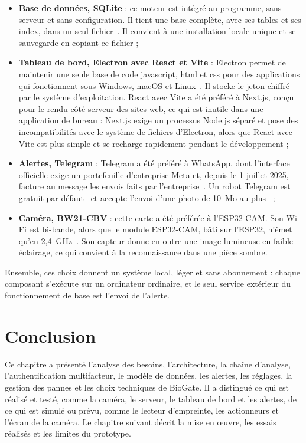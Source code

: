\begin{maj}
\begin{itemize}
  \item \textbf{Base de données, SQLite} : ce moteur est intégré au programme, sans serveur et sans configuration. Il tient une base complète, avec ses tables et ses index, dans un seul fichier~\cite{sqlite_about}. Il convient à une installation locale unique et se sauvegarde en copiant ce fichier ;
  \item \textbf{Tableau de bord, Electron avec React et Vite} : Electron permet de maintenir une seule base de code \gls{javascript}, \gls{html} et \gls{css} pour des applications qui fonctionnent sous Windows, macOS et Linux~\cite{electron_docs}. Il stocke le jeton chiffré par le système d'exploitation. React avec Vite a été préféré à Next.js, conçu pour le rendu côté serveur des sites web, ce qui est inutile dans une application de bureau : Next.js exige un processus Node.js séparé et pose des incompatibilités avec le système de fichiers d'Electron, alors que React avec Vite est plus simple et se recharge rapidement pendant le développement ;
  \item \textbf{Alertes, Telegram} : Telegram a été préféré à WhatsApp, dont l'interface officielle exige un portefeuille d'entreprise Meta et, depuis le 1\ier{} juillet 2025, facture au message les envois faits par l'entreprise~\cite{meta_wa_overview,meta_wa_pricing}. Un robot Telegram est gratuit par défaut~\cite{telegram_botfaq} et accepte l'envoi d'une photo de 10~Mo au plus~\cite{telegram_botapi} ;
  \item \textbf{Caméra, BW21-CBV} : cette carte a été préférée à l'ESP32-CAM. Son Wi-Fi est bi-bande, alors que le module ESP32-CAM, bâti sur l'ESP32, n'émet qu'en 2,4~GHz~\cite{aithinker_bw21_spec,aithinker_esp32cam,espressif_esp32}. Son capteur donne en outre une image lumineuse en faible éclairage, ce qui convient à la reconnaissance dans une pièce sombre.
\end{itemize}

Ensemble, ces choix donnent un système local, léger et sans abonnement : chaque composant s'exécute sur un ordinateur ordinaire, et le seul service extérieur du fonctionnement de base est l'envoi de l'alerte.
\end{maj}

\section*{Conclusion}

Ce chapitre a présenté l'analyse des besoins, l'architecture, la chaîne d'analyse, l'authentification multifacteur, le modèle de données, les alertes, les réglages, la gestion des pannes et les choix techniques de BioGate. Il a distingué ce qui est réalisé et testé, comme la caméra, le serveur, le tableau de bord et les alertes, de ce qui est simulé ou prévu, comme le lecteur d'empreinte, les actionneurs et l'écran de la caméra. Le chapitre suivant décrit la mise en œuvre, les essais réalisés et les limites du prototype.
